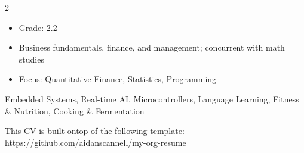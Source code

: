 \documentclass[10pt,a4paper,ragged2e,withhyper]{altacv}
\begin{document}
\begin{paracol}{2}
\begin{itemize}
\item Grade: 2.2
\item Business fundamentals, finance, and management; concurrent with math studies
\end{itemize}
\divider

\begin{itemize}
\item Focus: Quantitative Finance, Statistics, Programming
\end{itemize}
\label{sec:org343638e}

\divider


\divider


\divider


\divider


\bigskip
{}
\label{sec:org819e2fe}

\bigskip
{}
\label{sec:org55fc75a}

\nocite{*}
\printbibliography

\bigskip
{}
\label{sec:org7743674}
Embedded Systems, Real-time AI, Microcontrollers, Language Learning, Fitness \& Nutrition, Cooking \& Fermentation

\bigskip
\end{paracol}
\vfill
\scriptsize{This CV is built ontop of the following template: https://github.com/aidanscannell/my-org-resume}
\end{document}
